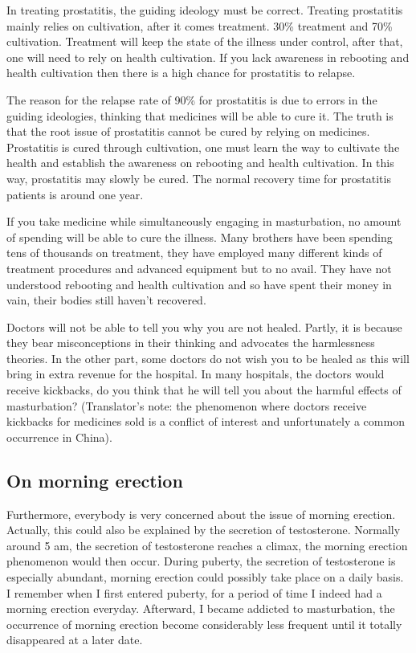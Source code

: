 \documentclass[
]{book}
\begin{document}
In treating prostatitis, the guiding ideology must be correct. Treating prostatitis mainly relies on cultivation, after it comes treatment. 30\% treatment and 70\% cultivation. Treatment will keep the state of the illness under control, after that, one will need to rely on health cultivation. If you lack awareness in rebooting and health cultivation then there is a high chance for prostatitis to relapse.

The reason for the relapse rate of 90\% for prostatitis is due to errors in the guiding ideologies, thinking that medicines will be able to cure it. The truth is that the root issue of prostatitis cannot be cured by relying on medicines. Prostatitis is cured through cultivation, one must learn the way to cultivate the health and establish the awareness on rebooting and health cultivation. In this way, prostatitis may slowly be cured. The normal recovery time for prostatitis patients is around one year.

If you take medicine while simultaneously engaging in masturbation, no amount of spending will be able to cure the illness. Many brothers have been spending tens of thousands on treatment, they have employed many different kinds of treatment procedures and advanced equipment but to no avail. They have not understood rebooting and health cultivation and so have spent their money in vain, their bodies still haven't recovered.

Doctors will not be able to tell you why you are not healed. Partly, it is because they bear misconceptions in their thinking and advocates the harmlessness theories. In the other part, some doctors do not wish you to be healed as this will bring in extra revenue for the hospital. In many hospitals, the doctors would receive kickbacks, do you think that he will tell you about the harmful effects of masturbation? (Translator's note: the phenomenon where doctors receive kickbacks for medicines sold is a conflict of interest and unfortunately a common occurrence in China).

\hypertarget{on-morning-erection}{%
\subsection{On morning erection}\label{on-morning-erection}}

Furthermore, everybody is very concerned about the issue of morning erection. Actually, this could also be explained by the secretion of testosterone. Normally around 5 am, the secretion of testosterone reaches a climax, the morning erection phenomenon would then occur. During puberty, the secretion of testosterone is especially abundant, morning erection could possibly take place on a daily basis. I remember when I first entered puberty, for a period of time I indeed had a morning erection everyday. Afterward, I became addicted to masturbation, the occurrence of morning erection become considerably less frequent until it totally disappeared at a later date.
\end{document}
